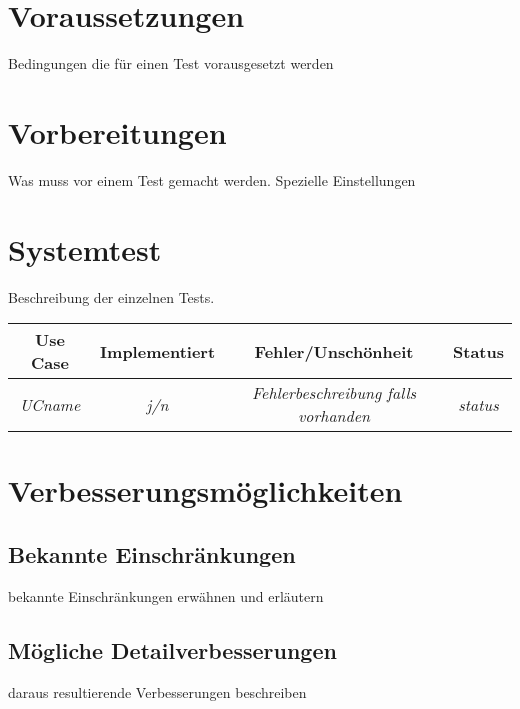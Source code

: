 \documentclass[a4paper,12pt,halfparskip,DIV14]{scrartcl}
\begin{document}

\section{Voraussetzungen} %
\label{sec:voraussetzungen}
Bedingungen die für einen Test vorausgesetzt werden

\section{Vorbereitungen} %
\label{sec:vorbereitungen}
Was muss vor einem Test gemacht werden. Spezielle Einstellungen

\section{Systemtest} %
\label{sec:systemtest}
Beschreibung der einzelnen Tests.

\begin{tabular}{cccc}
\hline
Use Case & Implementiert & Fehler/Unschönheit & Status\\
\hline
\emph{UCname} & \emph{j/n} & \emph{Fehlerbeschreibung falls vorhanden} & \emph{status}\\
\end{tabular}


\section{Verbesserungsmöglichkeiten} %
\label{sec:verbesserungsmöglichkeiten}
\subsection{Bekannte Einschränkungen} %
\label{sub:bekannte_einschränkungen}
bekannte Einschränkungen erwähnen und erläutern
\subsection{Mögliche Detailverbesserungen} %
\label{sub:mögliche_detailverbesserungen}
daraus resultierende Verbesserungen beschreiben
\end{document}
